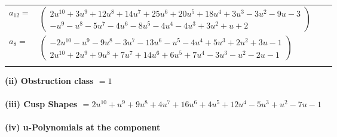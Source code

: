 \documentclass[1p]{elsarticle_modified}
\theoremstyle{definition}
\begin{document}
\begin{tabular}{m{7pt} m{180pt} m{7pt} m{180pt} }
\flushright $a_{12}=$&$\begin{pmatrix}2 u^{10}+3 u^9+12 u^8+14 u^7+25 u^6+20 u^5+18 u^4+3 u^3-3 u^2-9 u-3\\- u^9- u^8-5 u^7-4 u^6-8 u^5-4 u^4-4 u^3+3 u^2+u+2\end{pmatrix}$ \\
\flushright $a_{8}=$&$\begin{pmatrix}-2 u^{10}- u^9-9 u^8-3 u^7-13 u^6- u^5-4 u^4+5 u^3+2 u^2+3 u-1\\2 u^{10}+2 u^9+9 u^8+7 u^7+14 u^6+6 u^5+7 u^4-3 u^3- u^2-2 u-1\end{pmatrix}$\\&\end{tabular}
\flushleft \textbf{(ii) Obstruction class $= 1$}\\~\\
\flushleft \textbf{(iii) Cusp Shapes $= 2 u^{10}+u^9+9 u^8+4 u^7+16 u^6+4 u^5+12 u^4-5 u^3+u^2-7 u-1$}\\~\\
\newpage\renewcommand{\arraystretch}{1}
\flushleft \textbf{(iv) u-Polynomials at the component}\newline \\
\end{document}
